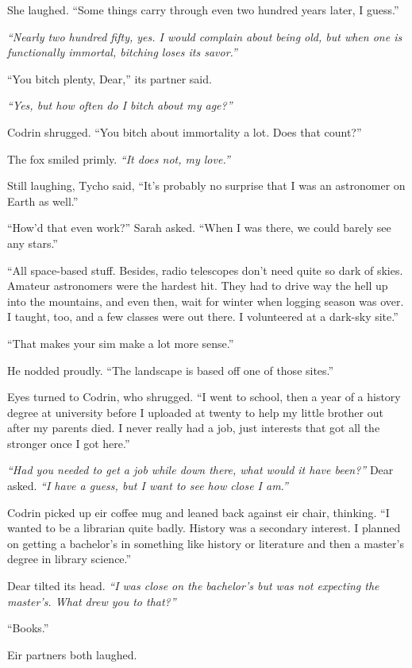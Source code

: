 She laughed. ``Some things carry through even two hundred years later, I guess.''

\emph{``Nearly two hundred fifty, yes. I would complain about being old, but when one is functionally immortal, bitching loses its savor.''}

``You bitch plenty, Dear,'' its partner said.

\emph{``Yes, but how often do I bitch about my age?''}

Codrin shrugged. ``You bitch about immortality a lot. Does that count?''

The fox smiled primly. \emph{``It does not, my love.''}

Still laughing, Tycho said, ``It's probably no surprise that I was an astronomer on Earth as well.''

``How'd that even work?'' Sarah asked. ``When I was there, we could barely see any stars.''

``All space-based stuff. Besides, radio telescopes don't need quite so dark of skies. Amateur astronomers were the hardest hit. They had to drive way the hell up into the mountains, and even then, wait for winter when logging season was over. I taught, too, and a few classes were out there. I volunteered at a dark-sky site.''

``That makes your sim make a lot more sense.''

He nodded proudly. ``The landscape is based off one of those sites.''

Eyes turned to Codrin, who shrugged. ``I went to school, then a year of a history degree at university before I uploaded at twenty to help my little brother out after my parents died. I never really had a job, just interests that got all the stronger once I got here.''

\emph{``Had you needed to get a job while down there, what would it have been?''} Dear asked. \emph{``I have a guess, but I want to see how close I am.''}

Codrin picked up eir coffee mug and leaned back against eir chair, thinking. ``I wanted to be a librarian quite badly. History was a secondary interest. I planned on getting a bachelor's in something like history or literature and then a master's degree in library science.''

Dear tilted its head. \emph{``I was close on the bachelor's but was not expecting the master's. What drew you to that?''}

``Books.''

Eir partners both laughed.

